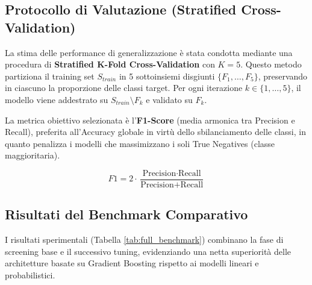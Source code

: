 \subsection{Protocollo di Valutazione (Stratified Cross-Validation)}

La stima delle performance di generalizzazione è stata condotta mediante una procedura di \textbf{Stratified K-Fold Cross-Validation} con $K=5$.
Questo metodo partiziona il training set $S_{train}$ in 5 sottoinsiemi disgiunti $\{F_1, \dots, F_5\}$, preservando in ciascuno la proporzione delle classi target. Per ogni iterazione $k \in \{1, \dots, 5\}$, il modello viene addestrato su $S_{train} \setminus F_k$ e validato su $F_k$.

\noindent
La metrica obiettivo selezionata è l'\textbf{F1-Score} (media armonica tra Precision e Recall), preferita all'Accuracy globale in virtù dello sbilanciamento delle classi, in quanto penalizza i modelli che massimizzano i soli True Negatives (classe maggioritaria).

\begin{equation}
    F1 = 2 \cdot \frac{\text{Precision} \cdot \text{Recall}}{\text{Precision} + \text{Recall}}
\end{equation}

\subsection{Risultati del Benchmark Comparativo}

I risultati sperimentali (Tabella \ref{tab:full_benchmark}) combinano la fase di screening base e il successivo tuning, evidenziando una netta superiorità delle architetture basate su Gradient Boosting rispetto ai modelli lineari e probabilistici.

